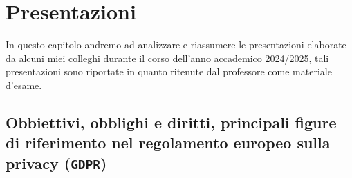\chapter{Presentazioni}
\thispagestyle{chapterInit}

In questo capitolo andremo ad analizzare e riassumere le presentazioni elaborate da alcuni miei colleghi durante il corso dell'anno accademico 2024/2025, tali presentazioni sono riportate in quanto ritenute dal professore come materiale d'esame.

\section[Il regolamento europeo sulla privacy (\texttt{GDPR})]{Obbiettivi, obblighi e diritti, principali figure di riferimento nel regolamento europeo sulla privacy (\texttt{GDPR})}
\label{sec:gdpr}
